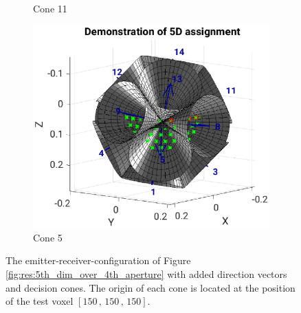 \begin{figure}[H]
\begin{subfigure}[b]{0.49\textwidth}
         \caption{Cone 11}
         \label{fig:res:5th_4th_cones11}
     \end{subfigure}
     \hfill
     \begin{subfigure}[b]{0.49\textwidth}
         \centering
         \includegraphics[width=1.3\textwidth,right]{Graphics/Results/4d_5d/5thDim_over_4thDim_150_150_150_cones_9_8_center.eps}
         \caption{Cone 5}
         \label{fig:res:5th_4th_cones5}
     \end{subfigure}
        \caption{The emitter-receiver-configuration of Figure \ref{fig:res:5th_dim_over_4th_aperture} with added direction vectors and decision cones. The origin of each cone is located at the position of the test voxel $[150\, , \, 150\, , \, 150]$. }
        \label{fig:res:5th_4th_cones}
\end{figure}


